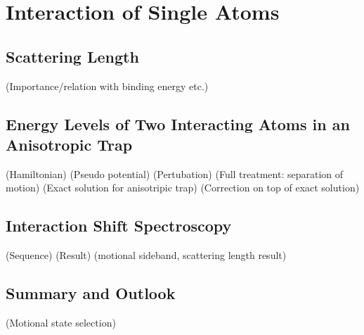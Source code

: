 
\chapter{Interaction of Single Atoms}
\label{ch:interaction-shift}

\section{Scattering Length}
(Importance/relation with binding energy etc.)

\section{Energy Levels of Two Interacting Atoms in an Anisotropic Trap}
(Hamiltonian)
(Pseudo potential)
(Pertubation)
(Full treatment: separation of motion)
(Exact solution for anisotripic trap)
(Correction on top of exact solution)

\section{Interaction Shift Spectroscopy}
(Sequence)
(Result)
(motional sideband, scattering length result)

\section{Summary and Outlook}
(Motional state selection)
